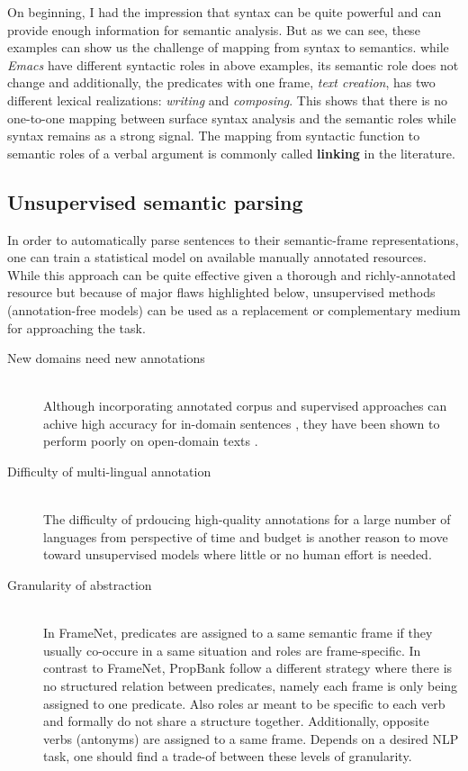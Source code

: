 On beginning, I had the impression that syntax can be quite powerful and
can provide enough information for semantic analysis. But as we can see, these
examples can show us the challenge of mapping from syntax to semantics.
while \emph{Emacs} have different syntactic roles in above examples, its
semantic role does not change and additionally, the predicates with one frame,
\emph{text creation}, has two different lexical realizations: \emph{writing} and
\emph{composing}.
This shows that there is no one-to-one mapping between surface syntax analysis and the semantic roles while syntax remains as a strong signal. The mapping
from syntactic function to semantic roles of a verbal argument is commonly 
called \textbf{linking} in the literature.
\citep{Grenager2006,Lang2011a,Lang2011b}
   
\subsection{Unsupervised semantic parsing}
\label{ssec:usp-sem-parse}
In order to automatically parse sentences to their semantic-frame
representations, one can train a statistical model on available
manually annotated resources.
While this approach can be quite effective given a thorough and richly-annotated
resource but because of major flaws highlighted below, unsupervised methods
(annotation-free models) can be used as a replacement or complementary medium
for approaching the task.

\begin{description}
\item[New domains need new annotations] \hfil \\ Although incorporating
annotated corpus and supervised approaches can achive high accuracy for in-domain sentences 
\cite{Punyakanok2008,Marquez2008}, they have been
shown to perform poorly on open-domain texts \cite{Pradhan2008}.
\item[Difficulty of multi-lingual annotation] \hfil \\ The difficulty
of prdoucing high-quality annotations for a large number of languages from
perspective of time and budget is another reason to move toward unsupervised
models where little or no human effort is needed.
\item[Granularity of abstraction] \hfil \\ In FrameNet, predicates are assigned
to a same semantic frame if they usually co-occure in a same situation and roles are
frame-specific. In contrast to FrameNet, PropBank follow a different strategy
where there is no structured relation between predicates, namely each frame is
only being assigned to one predicate.
Also roles ar meant to be specific to each verb and formally do not share a
structure together. Additionally, opposite verbs (antonyms) are assigned to a
same frame. Depends on a desired NLP task, one should find a trade-of between
these levels of granularity.

\end{description}


